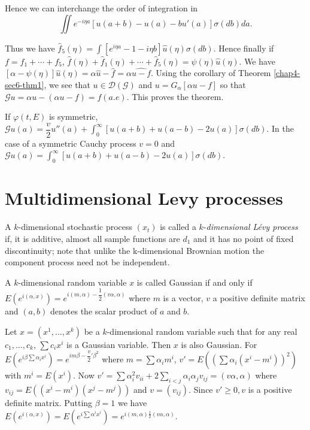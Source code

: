 Hence we can interchange the order of integration in 
$$
\iint e^{- i \eta a}[u (a+b) - u (a) - bu' (a)] \sigma (db) da.
$$

Thus we have $\hat{f}_5 (\eta) = \int [e^{i \eta a} -1-i \eta b]
\hat{u}(\eta) \sigma (db)$. Hence finally if $f = f_1 + \cdots + f_5$,
$\hat{f}(\eta) + \hat{f}_1(\eta) + \cdots + \hat{f}_5 (\eta) = \psi (\eta)
\hat{u}(\eta)$. We have $[\alpha - \psi (\eta)] \hat{u}(\eta) = \alpha
\hat{u} - \hat{f} = \alpha \widehat{u-f}$. Using the corollary of
Theorem \ref{chap4-sec6-thm1}, we see that $u \in \mathscr{D}(\mathscr{G})$ and $u =
G_{\alpha}[ \alpha u -f ]$ so that $\mathscr{G} u = \alpha u-(\alpha
u-f) = f(a. e)$. This proves the theorem. 

\begin{remark*}
  If $\varphi (t, E)$ is symmetric, $\mathscr{G} u(a) = \dfrac{v}{2}
  u'' (a) + \int^{\infty}_0 [u(a+b) + u(a-b) - 2u (a)] \sigma
  (db)$. In the case of a symmetric Cauchy process $v=0$ and
  $\mathscr{G} u(a) = \int^{\infty}_0 [ u(a+b) + u (a-b) -2u(a)]
  \sigma (db)$. 
\end{remark*}

\section{Multidimensional Levy processes}\label{chap4-sec7}\pageoriginale

A $k$-dimensional stochastic process $(x_t)$ is called a
$k$-\textit{dimensional L\'evy process} if, it is additive, almost all
sample functions are $d_1$ and it has no point of fixed discontinuity; note
that unlike the k-dimensional Brownian motion the component process
need not be independent. 

A $k$-dimensional random variable $x$ is called Gaussian if and only if
$E(e^{i (\alpha, x)}) = e^{i(m, \alpha) - \dfrac{1}{2}(v \alpha,
  \alpha)}$ where $m$ is a vector, $v$ a positive definite matrix and
$(a, b)$ denotes the scalar product of $a$ and $b$. 

Let $x= (x^1, \ldots, x^k)$ be a $k$-dimensional random variable such
that for any real $c_1, \ldots , c_k$, $\sum c_i x^i$ is a Gaussian
variable. Then $x$ is also Gaussian. For $E(e^{i \beta \sum \alpha_i
  x^i}) = e^{im \beta - \dfrac{v}{2}' \beta^2}$ where $m = \sum
\alpha_i m^i$, $v'= E(( \sum \alpha_i (x^i-m^i))^2)$ with $m^i =
E(x^i)$. Now $v'= \sum \alpha^2_i v_{ii} + 2 \sum\limits_{i < j}
\alpha_i \alpha_j v_{ij} = (v \alpha, \alpha)$ where $v_{ij}= E(( x^i-
m^i) (x^j-m^j))$ and $v=(v_{ij})$. Since $v' \geq 0, v$ is a positive
definite matrix. Putting $\beta = 1$ we have $E(e^{i(\alpha, x)}) =
E(e^{i \sum \alpha^i x^i}) = e^{i (m, \alpha) \frac{1}{2} (v \alpha,
  \alpha)}$. 

